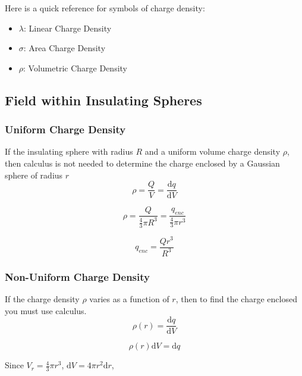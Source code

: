 \documentclass[a4paper,12pt]{article}
\begin{document}
				Here is a quick reference for symbols of charge density:
				\begin{itemize}
						\item $\lambda$: Linear Charge Density
						\item $\sigma$: Area Charge Density
						\item $\rho$: Volumetric Charge Density
				\end{itemize}
				
				\subsection{Field within Insulating Spheres}
						\subsubsection{Uniform Charge Density}
								If the insulating sphere with radius $R$ and a uniform volume charge density $\rho$, then calculus is not needed to determine the charge enclosed by a Gaussian sphere of radius $r$
								\begin{equation*}
										\rho = \frac{Q}{V} = \frac{\mathrm{d}q}{\mathrm{d}V} 
								\end{equation*}
										
								\begin{equation*}
										\rho = \frac{Q}{\frac{4}{3}\pi R^{3}} = \frac{q_{enc}}{\frac{4}{3}\pi r^{3}}
								\end{equation*}

								\begin{equation*}
										q_{enc} = \frac{Qr^{3}}{R^{3}}
								\end{equation*}

						\subsubsection{Non-Uniform Charge Density}
							If the charge density $\rho$ varies as a function of $r$, then to find the charge enclosed you must use calculus.					
							\begin{equation*}
									\rho(r) = \frac{\mathrm{d}q}{\mathrm{d}V} 
							\end{equation*}

							\begin{equation*}
									\rho(r) \mathrm{d}V = \mathrm{d}q 
							\end{equation*}

							Since $V_{r} = \frac{4}{3}\pi r^{3}$, $\mathrm{d}V = 4 \pi r^{2} \mathrm{d}r$,
\end{document}
